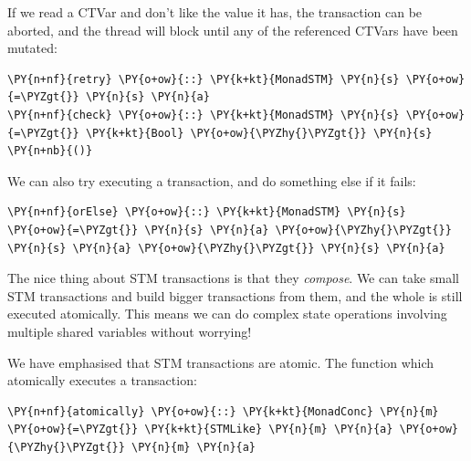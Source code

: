 If we read a CTVar and don't like the value it has, the transaction
can be aborted, and the thread will block until any of the referenced
CTVars have been mutated:


\begin{Verbatim}[commandchars=\\\{\}]
\PY{n+nf}{retry} \PY{o+ow}{::} \PY{k+kt}{MonadSTM} \PY{n}{s} \PY{o+ow}{=\PYZgt{}} \PY{n}{s} \PY{n}{a}
\PY{n+nf}{check} \PY{o+ow}{::} \PY{k+kt}{MonadSTM} \PY{n}{s} \PY{o+ow}{=\PYZgt{}} \PY{k+kt}{Bool} \PY{o+ow}{\PYZhy{}\PYZgt{}} \PY{n}{s} \PY{n+nb}{()}
\end{Verbatim}

We can also try executing a transaction, and do something else if it
fails:


\begin{Verbatim}[commandchars=\\\{\}]
\PY{n+nf}{orElse} \PY{o+ow}{::} \PY{k+kt}{MonadSTM} \PY{n}{s} \PY{o+ow}{=\PYZgt{}} \PY{n}{s} \PY{n}{a} \PY{o+ow}{\PYZhy{}\PYZgt{}} \PY{n}{s} \PY{n}{a} \PY{o+ow}{\PYZhy{}\PYZgt{}} \PY{n}{s} \PY{n}{a}
\end{Verbatim}

The nice thing about STM transactions is that they
\textit{compose}. We can take small STM transactions and build bigger
transactions from them, and the whole is still executed
atomically. This means we can do complex state operations involving
multiple shared variables without worrying!

We have emphasised that STM transactions are atomic. The function
which atomically executes a transaction:


\begin{Verbatim}[commandchars=\\\{\}]
\PY{n+nf}{atomically} \PY{o+ow}{::} \PY{k+kt}{MonadConc} \PY{n}{m} \PY{o+ow}{=\PYZgt{}} \PY{k+kt}{STMLike} \PY{n}{m} \PY{n}{a} \PY{o+ow}{\PYZhy{}\PYZgt{}} \PY{n}{m} \PY{n}{a}
\end{Verbatim}

